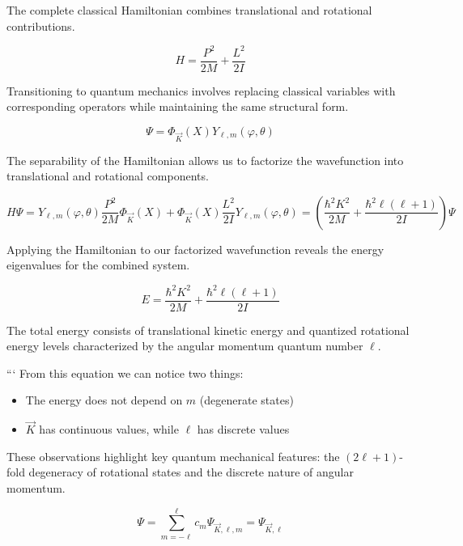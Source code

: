 \documentclass[italian]{HKNdocument}
\begin{document}
The complete classical Hamiltonian combines translational and rotational contributions.

\begin{equation*}
H=\frac{P^{2}}{2 M}+\frac{L^{2}}{2 I} \tag{8.75}
\end{equation*}

Transitioning to quantum mechanics involves replacing classical variables with corresponding operators while maintaining the same structural form.

\begin{equation*}
\Psi=\Phi_{\vec{K}}(X) Y_{\ell, m}(\varphi, \theta) \tag{8.76}
\end{equation*}

The separability of the Hamiltonian allows us to factorize the wavefunction into translational and rotational components.

\begin{equation*}
H \Psi=Y_{\ell, m}(\varphi, \theta) \frac{P^{2}}{2 M} \Phi_{\vec{K}}(X)+\Phi_{\vec{K}}(X) \frac{L^{2}}{2 I} Y_{\ell, m}(\varphi, \theta)=\left(\frac{\hbar^{2} K^{2}}{2 M}+\frac{\hbar^{2} \ell(\ell+1)}{2 I}\right) \Psi \tag{8.77}
\end{equation*}

Applying the Hamiltonian to our factorized wavefunction reveals the energy eigenvalues for the combined system.

\begin{equation*}
E=\frac{\hbar^{2} K^{2}}{2 M}+\frac{\hbar^{2} \ell(\ell+1)}{2 I} \tag{8.78}
\end{equation*}

The total energy consists of translational kinetic energy and quantized rotational energy levels characterized by the angular momentum quantum number $\ell$.

```
From this equation we can notice two things:

\begin{itemize}
  \item The energy does not depend on $m$ (degenerate states)
  \item $\vec{K}$ has continuous values, while $\ell$ has discrete values
\end{itemize}

These observations highlight key quantum mechanical features: the $(2\ell+1)$-fold degeneracy of rotational states and the discrete nature of angular momentum.

\begin{equation*}
\Psi=\sum_{m=-\ell}^{\ell} c_{m} \Psi_{\vec{K}, \ell, m}=\Psi_{\vec{K}, \ell} \tag{8.79}
\end{equation*}
\end{document}
